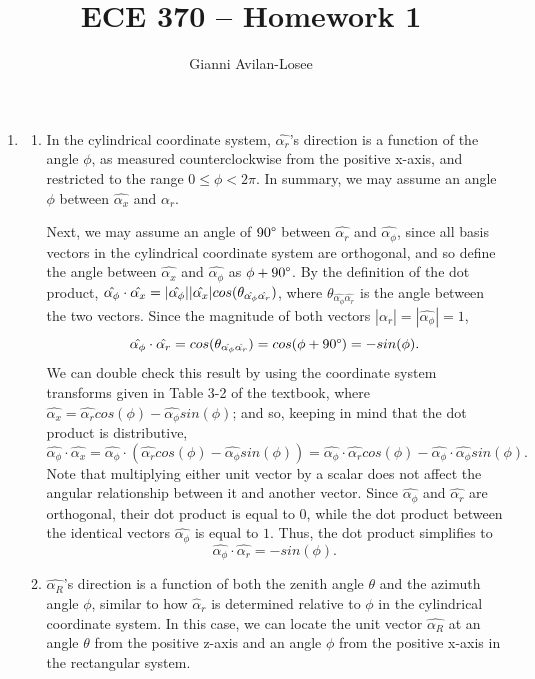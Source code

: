 \documentclass{article}
\title{ECE 370 -- Homework 1}
\author{Gianni Avilan-Losee}
\begin{document}

\begin{enumerate}
	\item
\begin{enumerate}[label=\alph*)]
	\item In the cylindrical coordinate system, $\hat{\alpha_r}$'s direction is a function of the angle $\phi$, as measured counterclockwise from the positive x-axis, and restricted to the range $0 \leq \phi < 2\pi$. In summary, we may assume an angle \(\phi\) between \(\hat{\alpha_x}\) and \(\hat{\alpha_r}\).

	Next, we may assume an angle of $90\degree$ between $\hat{\alpha_r}$ and $\hat{\alpha_{\phi}}$, since all basis vectors in the cylindrical coordinate system are orthogonal, and so define the angle between $\hat{\alpha_x}$ and $\hat{\alpha_{\phi}}$ as $\phi + 90\degree$. By the definition of the dot product, $\hat{\alpha_\phi} \cdot \hat{\alpha_{x}} = |\hat{\alpha_{\phi}}| \space |\hat{\alpha_{x}}|cos(\theta_{\hat{\alpha_{\phi}}\hat{\alpha_{r}}})$, where $\theta_{\hat{\alpha_{\phi}}\hat{\alpha_{r}}}$ is the angle between the two vectors. Since the magnitude of both vectors $|\hat{\alpha_{r}}|=|\hat{\alpha_{\phi}}| = 1$, $$\hat{\alpha_{\phi}} \cdot \hat{\alpha_r} = cos(\theta_{\hat{\alpha_{\phi}}\hat{\alpha_{r}}})=cos(\phi + 90\degree) = -sin(\phi).$$ We can double check this result by using the coordinate system transforms given in Table 3-2 of the textbook, where $\hat{\alpha_x} = \hat{\alpha_r}cos(\phi) - \hat{\alpha_{\phi}}sin(\phi)$; and so, keeping in mind that the dot product is distributive, $$\hat{\alpha_{\phi}} \cdot \hat{\alpha_x} = \hat{\alpha_{\phi}} \cdot (\hat{\alpha_r}cos(\phi) - \hat{\alpha_{\phi}}sin(\phi)) = \hat{\alpha_{\phi}} \cdot \hat{\alpha_r}cos(\phi) - \hat{\alpha_{\phi}} \cdot \hat{\alpha_{\phi}}sin(\phi).$$ Note that multiplying either unit vector by a scalar does not affect the angular relationship between it and another vector. Since $\hat{\alpha_{\phi}}$ and $\hat{\alpha_r}$ are orthogonal, their dot product is equal to $0$, while the dot product between the identical vectors $\hat{\alpha_{\phi}}$ is equal to $1$. Thus, the dot product simplifies to $$\hat{\alpha_{\phi}} \cdot \hat{\alpha_r} = -sin(\phi).$$

  \item $\hat{\alpha_{R}}$'s direction is a function of both the zenith angle $\theta$ and the azimuth angle $\phi$, similar to how $\hat{\alpha}_r$ is determined relative to $\phi$ in the cylindrical coordinate system. In this case, we can locate the unit vector $\hat{\alpha_R}$ at an angle $\theta$ from the positive z-axis and an angle $\phi$ from the positive x-axis in the rectangular system. 


\end{enumerate}
\end{enumerate}
\end{document}
